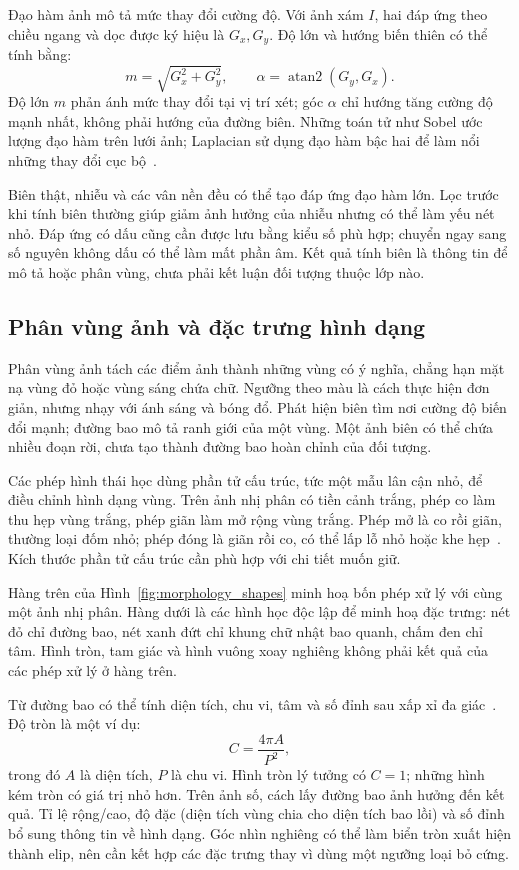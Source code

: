 Đạo hàm ảnh mô tả mức thay đổi cường độ. Với ảnh xám $I$, hai đáp ứng theo chiều ngang và dọc được ký hiệu là $G_x,G_y$. Độ lớn và hướng biến thiên có thể tính bằng:
\begin{equation}
 m=\sqrt{G_x^2+G_y^2},\qquad
 \alpha=\operatorname{atan2}(G_y,G_x).
 \label{eq:gradient_magnitude}
\end{equation}
Độ lớn $m$ phản ánh mức thay đổi tại vị trí xét; góc $\alpha$ chỉ hướng tăng cường độ mạnh nhất, không phải hướng của đường biên. Những toán tử như Sobel ước lượng đạo hàm trên lưới ảnh; Laplacian sử dụng đạo hàm bậc hai để làm nổi những thay đổi cục bộ~\cite{opencv_gradients}.

Biên thật, nhiễu và các vân nền đều có thể tạo đáp ứng đạo hàm lớn. Lọc trước khi tính biên thường giúp giảm ảnh hưởng của nhiễu nhưng có thể làm yếu nét nhỏ. Đáp ứng có dấu cũng cần được lưu bằng kiểu số phù hợp; chuyển ngay sang số nguyên không dấu có thể làm mất phần âm. Kết quả tính biên là thông tin để mô tả hoặc phân vùng, chưa phải kết luận đối tượng thuộc lớp nào.

\subsection{Phân vùng ảnh và đặc trưng hình dạng}
Phân vùng ảnh tách các điểm ảnh thành những vùng có ý nghĩa, chẳng hạn mặt nạ vùng đỏ hoặc vùng sáng chứa chữ. Ngưỡng theo màu là cách thực hiện đơn giản, nhưng nhạy với ánh sáng và bóng đổ. Phát hiện biên tìm nơi cường độ biến đổi mạnh; đường bao mô tả ranh giới của một vùng. Một ảnh biên có thể chứa nhiều đoạn rời, chưa tạo thành đường bao hoàn chỉnh của đối tượng.

Các phép hình thái học dùng phần tử cấu trúc, tức một mẫu lân cận nhỏ, để điều chỉnh hình dạng vùng. Trên ảnh nhị phân có tiền cảnh trắng, phép co làm thu hẹp vùng trắng, phép giãn làm mở rộng vùng trắng. Phép mở là co rồi giãn, thường loại đốm nhỏ; phép đóng là giãn rồi co, có thể lấp lỗ nhỏ hoặc khe hẹp~\cite{opencv_morphology}. Kích thước phần tử cấu trúc cần phù hợp với chi tiết muốn giữ.

Hàng trên của Hình~\ref{fig:morphology_shapes} minh hoạ bốn phép xử lý với cùng một ảnh nhị phân. Hàng dưới là các hình học độc lập để minh hoạ đặc trưng: nét đỏ chỉ đường bao, nét xanh đứt chỉ khung chữ nhật bao quanh, chấm đen chỉ tâm. Hình tròn, tam giác và hình vuông xoay nghiêng không phải kết quả của các phép xử lý ở hàng trên.

Từ đường bao có thể tính diện tích, chu vi, tâm và số đỉnh sau xấp xỉ đa giác~\cite{opencv_contours}. Độ tròn là một ví dụ:
\begin{equation}
 C=\frac{4\pi A}{P^2},
 \label{eq:circularity}
\end{equation}
trong đó $A$ là diện tích, $P$ là chu vi. Hình tròn lý tưởng có $C=1$; những hình kém tròn có giá trị nhỏ hơn. Trên ảnh số, cách lấy đường bao ảnh hưởng đến kết quả. Tỉ lệ rộng/cao, độ đặc (diện tích vùng chia cho diện tích bao lồi) và số đỉnh bổ sung thông tin về hình dạng. Góc nhìn nghiêng có thể làm biển tròn xuất hiện thành elip, nên cần kết hợp các đặc trưng thay vì dùng một ngưỡng loại bỏ cứng.

